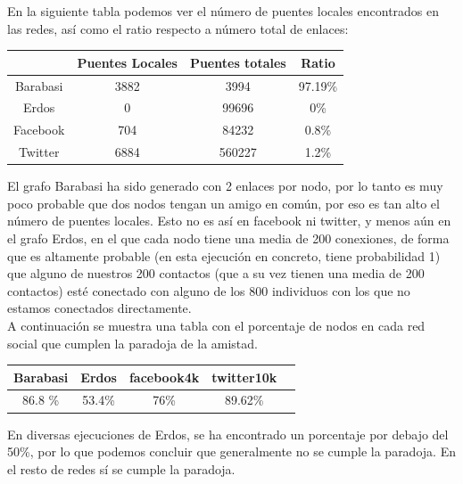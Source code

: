 \documentclass[spanish]{assignment}
\begin{document}
	En la siguiente tabla podemos ver el número de puentes locales encontrados en las redes, así como el ratio respecto a número total de enlaces:

	\begin{center}
		\begin{tabular}{|c|c|c|c|}
			\hline
			&\textbf{Puentes Locales} & \textbf{Puentes totales} & \textbf{Ratio} \\ 
			\hline
			Barabasi & 3882 & 3994 & 97.19\% \\
			\hline
			Erdos & 0 & 99696 & 0\% \\
			\hline
			Facebook & 704 & 84232 & 0.8\% \\
			\hline
			Twitter & 6884 & 560227 & 1.2\% \\
			\hline
		\end{tabular}
	\end{center}	
	
	El grafo Barabasi ha sido generado con 2 enlaces por nodo, por lo tanto es muy poco probable que dos nodos tengan un amigo en común, por eso es tan alto
	el número de puentes locales.
	Esto no es así en facebook ni twitter, y menos aún en el grafo Erdos, en el que cada nodo tiene una media de 200 conexiones, de forma que es altamente probable
	(en esta ejecución en concreto, tiene probabilidad 1) que alguno de nuestros 200 contactos (que a su vez tienen una media de 200 contactos) esté conectado con alguno de los 800 individuos con los que no estamos conectados directamente.\\
	
	A continuación se muestra una tabla con el porcentaje de nodos en cada red social que cumplen la paradoja de la amistad.
	\begin{center}
		\begin{tabular}{|c|c|c|c|c|}
			\hline
			\textbf{Barabasi} & \textbf{Erdos} & \textbf{facebook4k} & \textbf{twitter10k} \\ 
			\hline
			86.8 \% & 53.4\% & 76\% & 89.62\% \\
			\hline
		\end{tabular}
	\end{center}
	En diversas ejecuciones de Erdos, se ha encontrado un porcentaje por debajo del 50\%, por lo que podemos concluir que generalmente no se cumple la paradoja.
	En el resto de redes sí se cumple la paradoja.
	
\end{document}
